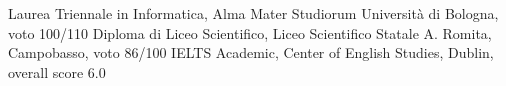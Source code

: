 %
%
%


\begin{scholarship}
					{Laurea Triennale in Informatica, Alma Mater Studiorum Universit\`a di Bologna, voto 100/110}
					{Diploma di Liceo Scientifico, Liceo Scientifico Statale A. Romita, Campobasso, voto 86/100}
					{IELTS Academic, Center of English Studies, Dublin, overall score 6.0}
\end{scholarship}
